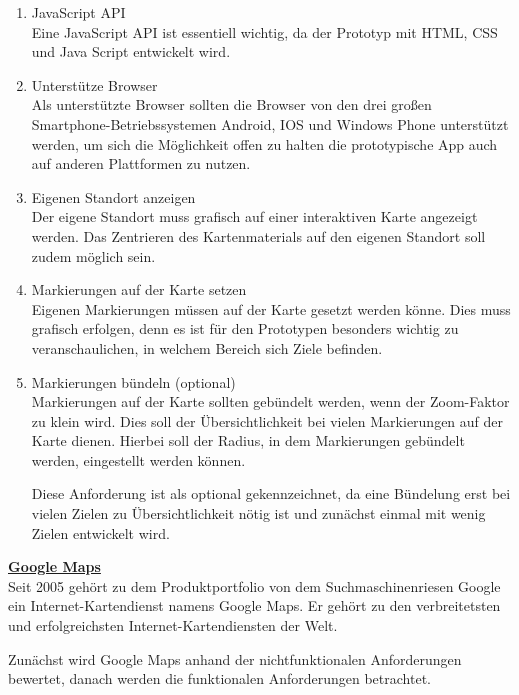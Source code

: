 \begin{enumerate}
\item JavaScript API\\
Eine JavaScript API ist essentiell wichtig, da der Prototyp mit HTML, CSS und Java Script entwickelt wird. 

\item Unterstütze Browser\\
Als unterstützte Browser sollten die Browser von den drei großen Smartphone-Betriebssystemen Android, IOS und Windows Phone unterstützt werden, um sich die Möglichkeit offen zu halten die prototypische App auch auf anderen Plattformen zu nutzen.

\item Eigenen Standort anzeigen\\
Der eigene Standort muss grafisch auf einer interaktiven Karte angezeigt werden. Das Zentrieren des Kartenmaterials auf den eigenen Standort soll zudem möglich sein.

\item Markierungen auf der Karte setzen\\
Eigenen Markierungen müssen auf der Karte gesetzt werden könne. Dies muss grafisch erfolgen, denn es ist für den Prototypen besonders wichtig zu veranschaulichen, in welchem Bereich sich Ziele befinden. 

\item Markierungen bündeln (optional)\\
Markierungen auf der Karte sollten gebündelt werden, wenn der Zoom-Faktor zu klein wird. Dies soll der Übersichtlichkeit bei vielen Markierungen auf der Karte dienen. Hierbei soll der Radius, in dem Markierungen gebündelt werden, eingestellt werden können.

Diese Anforderung ist als optional gekennzeichnet, da eine Bündelung erst bei vielen Zielen zu Übersichtlichkeit nötig ist und zunächst einmal mit wenig Zielen entwickelt wird.

\end{enumerate}



\textbf{\underline{Google Maps}}\\

Seit 2005 gehört zu dem Produktportfolio von dem Suchmaschinenriesen Google ein Internet-Kartendienst namens Google Maps. 
Er gehört zu den verbreitetsten und erfolgreichsten Internet-Kartendiensten der Welt. \cite[Lexikon Google Maps]{itwissen}\cite[S.88]{gruber2015}

Zunächst wird Google Maps anhand der nichtfunktionalen Anforderungen bewertet, danach werden die funktionalen Anforderungen betrachtet.

